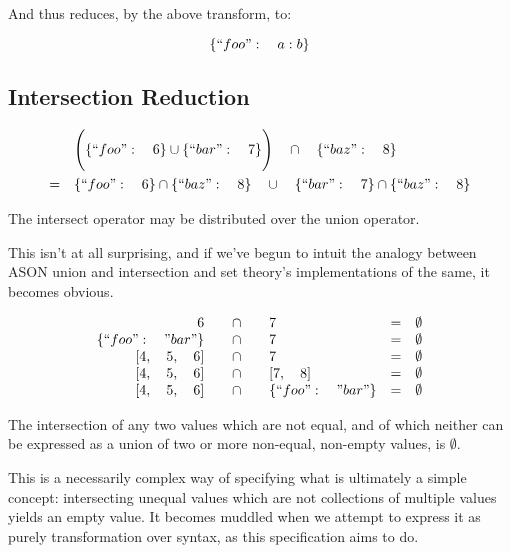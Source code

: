 \documentclass[letterpaper]{article}
\begin{document}
And thus reduces, by the above transform, to:

\begin{equation}
\{``foo":\quad a : b\}
\end{equation}

\subsection{Intersection Reduction}

\begin{prule}
\label{sec:interdist}
\begin{equation}
\begin{split}
& \Bigg( \{``foo":\quad6\} \cup \{``bar":\quad7\} \Bigg) \quad \cap \quad
\{``baz":\quad8\} \\
= \quad& \{``foo":\quad6\} \cap \{``baz":\quad8\} \quad \cup \quad \{``bar":\quad7\}
 \cap \{``baz":\quad8\}
\end{split}
\end{equation}

The intersect operator may be distributed over the union operator.
\end{prule}

This isn't at all surprising, and if we've begun to intuit the analogy between
ASON union and intersection and set theory's implementations of the same, it
becomes obvious.

\begin{prule}
\label{sec:interelim}
\begin{equation}
\begin{array}{rclcl}
6 \quad&\cap&\quad 7 & = & \emptyset \\
\{``foo":\quad"bar"\} \quad&\cap&\quad 7 & = & \emptyset \\
{[}4,\quad5,\quad6] \quad&\cap&\quad 7 & = & \emptyset \\
{[}4,\quad5,\quad6] \quad&\cap&\quad {[}7,\quad8] & = & \emptyset \\
{[}4,\quad5,\quad6] \quad&\cap&\quad \{``foo":\quad"bar"\} & = & \emptyset \\
\end{array}
\end{equation}

The intersection of any two values which are not equal, and of which neither
can be expressed as a union of two or more non-equal, non-empty values, is
\(\emptyset\).
\end{prule}

This is a necessarily complex way of specifying what is ultimately a simple
concept: intersecting unequal values which are not collections of multiple
values yields an empty value. It becomes muddled when we attempt to express it
as purely transformation over syntax, as this specification aims to do.
\end{document}
